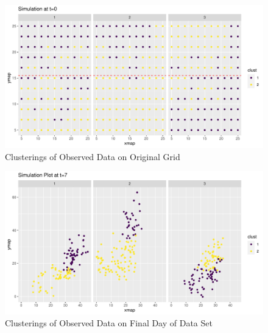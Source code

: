 \documentclass[12pt]{article}
\begin{document}
\begin{figure}[tbp]

{\centering \includegraphics[width=\linewidth,]{spatio-temporal-model-arctic-sea-ice_files/figure-latex/plot-og-clus-1} 

}

\caption{Clusterings of Observed Data on Original Grid}\label{fig:plot-og-clus}
\end{figure}

\begin{figure}[tbp]

{\centering \includegraphics[width=\linewidth,]{spatio-temporal-model-arctic-sea-ice_files/figure-latex/all-clus-1} 

}

\caption{Clusterings of Observed Data on Final Day of Data Set}\label{fig:all-clus}
\end{figure}
\end{document}
